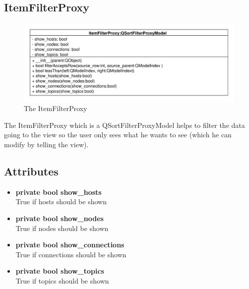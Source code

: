 \subsection{ItemFilterProxy}
\begin{figure}[htbp]
	\begin{minipage}[t]{7cm}
		\vspace{0pt}
		\centering
		\includegraphics[scale=0.6]{./diagram_pictures/ItemFilter.pdf}
		\caption{The ItemFilterProxy}
	\end{minipage}
\end{figure} 
The ItemFilterProxy which is a QSortFilterProxyModel helps to filter the data going to the view so the user only sees what he wants to see (which he can modify by telling the view). 
\subsection{Attributes}
\begin{itemize}
  \item \textbf{private bool show\_hosts}\\
  True if hosts should be shown
  \item \textbf{private bool show\_nodes}\\
  True if nodes should be shown
  \item \textbf{private bool show\_connections}\\
  True if connections should be shown
  \item \textbf{private bool show\_topics}\\
  True if topics should be shown
\end{itemize}
